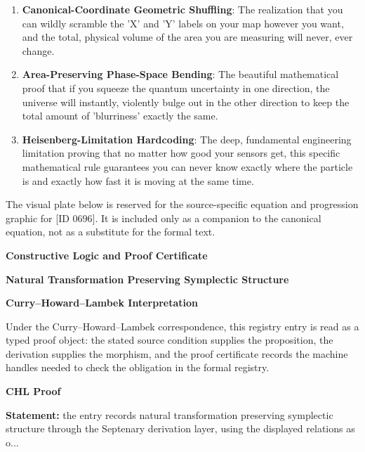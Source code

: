 \begin{enumerate}[leftmargin=1.6em,itemsep=6pt,topsep=4pt]
\item \textbf{Canonical-Coordinate Geometric Shuffling}: The realization that you can wildly scramble the 'X' and 'Y' labels on your map however you want, and the total, physical volume of the area you are measuring will never, ever change.
\item \textbf{Area-Preserving Phase-Space Bending}: The beautiful mathematical proof that if you squeeze the quantum uncertainty in one direction, the universe will instantly, violently bulge out in the other direction to keep the total amount of 'blurriness' exactly the same.
\item \textbf{Heisenberg-Limitation Hardcoding}: The deep, fundamental engineering limitation proving that no matter how good your sensors get, this specific mathematical rule guarantees you can never know exactly where the particle is and exactly how fast it is moving at the same time.
\end{enumerate}

\begingroup\footnotesize\sloppy
The visual plate below is reserved for the source-specific equation and progression graphic for [ID 0696]. It is included only as a companion to the canonical equation, not as a substitute for the formal text.
\par\endgroup
\ifTZPDarkEdition
{}
\fi

\clearpage
\begingroup\tzpsupportsetup
\noindent\textbf{\fontsize{10.8pt}{12.8pt}\selectfont [ID 0696] Constructive Logic and Proof Certificate}\par
\noindent\textbf{\fontsize{10pt}{12pt}\selectfont Natural Transformation Preserving Symplectic Structure}\par
\vspace{0.45em}
\begingroup
\footnotesize
\setlength{\parskip}{0.22em}
\setlength{\parindent}{0pt}
\noindent\textbf{Curry--Howard--Lambek Interpretation}\par
Under the Curry--Howard--Lambek correspondence, this registry entry is read as a typed proof
object: the stated source condition supplies the proposition, the derivation supplies the
morphism, and the proof certificate records the machine handles needed to check the obligation
in the formal registry.

\vspace{0.45em}
\noindent\textbf{CHL Proof}\par
\textbf{Statement:} the entry records natural transformation preserving symplectic structure through the
Septenary derivation layer, using the displayed relations as o...

